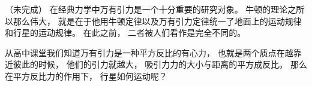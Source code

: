 
\begin{issues}
\issueDraft
\end{issues}

（未完成）
在经典力学中万有引力是一个十分重要的研究对象。 牛顿的理论之所以那么伟大， 就是在于他用牛顿定律以及万有引力定律统一了地面上的运动规律和行星的运动规律。 在此之前， 二者被人们看作是完全不同的。

从高中课堂我们知道万有引力是一种平方反比的有心力， 也就是两个质点在越靠近彼此的时候， 他们的引力就越大， 吸引力力的大小与距离的平方成反比。 那么在平方反比力的作用下， 行星如何运动呢？

